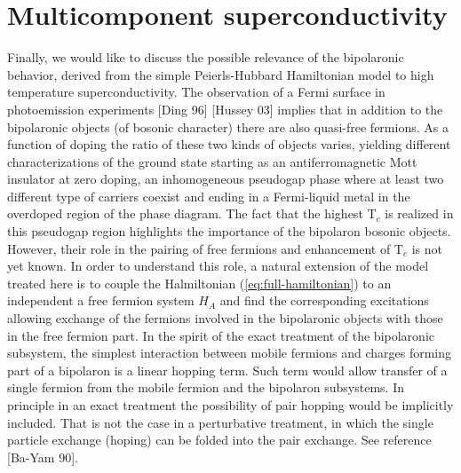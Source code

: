\section{Multicomponent superconductivity}

Finally, we would like to discuss the possible relevance of the bipolaronic behavior, derived from the simple Peierls-Hubbard Hamiltonian model to high temperature superconductivity. The observation of a Fermi surface in photoemission experiments [Ding 96] [Hussey 03] implies that in addition to the bipolaronic objects (of bosonic character) there are also quasi-free fermions. As a function of doping the ratio of these two kinds of objects varies, yielding different characterizations of the ground state starting as an antiferromagnetic Mott insulator at zero doping, an inhomogeneous pseudogap phase where at least two different type of carriers coexist and ending in a Fermi-liquid metal in the overdoped region of the phase diagram. The fact that the highest T$_c$  is realized in this pseudogap region highlights the importance of the bipolaron bosonic objects. However, their role in the pairing of free fermions and enhancement of T$_c$ is not yet known. In order to understand this role, a natural extension of the model treated here is to couple the Halmiltonian  (\ref{eq:full-hamiltonian}) to an independent a free fermion system $H_A$ and find the corresponding excitations allowing exchange of the fermions involved in the bipolaronic objects with those in the free fermion part. In the spirit of the exact treatment of the bipolaronic subsystem,  the simplest interaction between mobile fermions and charges forming part of a bipolaron is a linear hopping term. Such term would allow transfer of a single fermion from the mobile fermion and the bipolaron subsystems.  In principle in an exact treatment the possibility of pair hopping would be implicitly included. That is not the case in a perturbative treatment, in which the single particle exchange (hoping) can be folded into the pair exchange. See reference [Ba-Yam 90].

